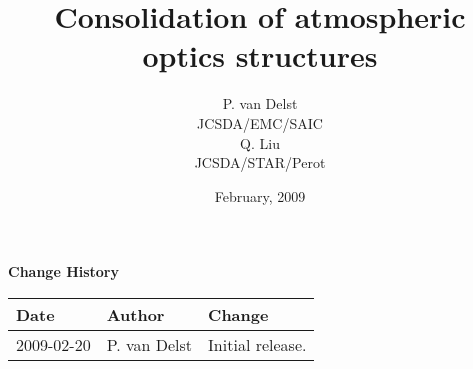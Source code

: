


%


\title{Consolidation of atmospheric optics structures}
\author{P. van Delst\\JCSDA/EMC/SAIC\\[0.25in]
        Q. Liu\\JCSDA/STAR/Perot}
\date{February, 2009}



\maketitle

\draftwatermark

\thispagestyle{empty}
\vspace*{10cm}
\begin{center}
  {\sffamily\Large\bfseries Change History}
  \begin{table}[htp]
    \centering
    \begin{tabular}{|p{2cm}|p{3cm}|p{8cm}|}
      \hline
      \sffamily\textbf{Date} & \sffamily\textbf{Author} & \sffamily\textbf{Change}\\
      \hline\hline
      2009-02-20 & P. van Delst & Initial release.\\
      \hline
    \end{tabular}
  \end{table}
\end{center}
\clearpage
{}
\setcounter{page}{1}



%


%
%


%



